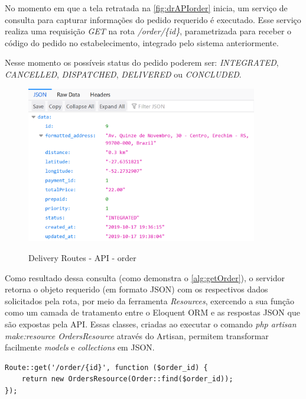 No momento em que a tela retratada na \autoref{fig:drAPIorder} inicia, um serviço de consulta para capturar informações do pedido requerido é executado. Esse serviço realiza uma requisição \textit{GET} na rota \textit{/order/\{id\}}, parametrizada para receber o código do pedido no estabelecimento, integrado pelo sistema anteriormente.

Nesse momento os possíveis status do pedido poderem ser: \textit{INTEGRATED}, \textit{CANCELLED}, \textit{DISPATCHED}, \textit{DELIVERED} ou \textit{CONCLUDED}.

\begin{figure}[H]
    \centering
    \caption{Delivery Routes - API - order}
    \includegraphics[width=0.9\textwidth]{./dados/figuras/fig22}
    \label{fig:drAPIorder}
\end{figure}

Como resultado dessa consulta (como demonstra o \autoref{alg:getOrder}), o servidor retorna o objeto requerido (em formato JSON) com os respectivos dados solicitados pela rota, por meio da ferramenta \textit{Resources}, exercendo a sua função como um camada de tratamento entre o Eloquent ORM e as respostas JSON que são expostas pela API. Essas classes, criadas ao executar o comando \textit{php artisan make:resource OrdersResource} através do Artisan, permitem transformar facilmente \textit{models} e \textit{collections} em JSON.

\begin{lstlisting}[caption={Delivery Routes - Route order}, style=htmlcssjs, label=alg:getOrder]
Route::get('/order/{id}', function ($order_id) {
    return new OrdersResource(Order::find($order_id));
});
\end{lstlisting}